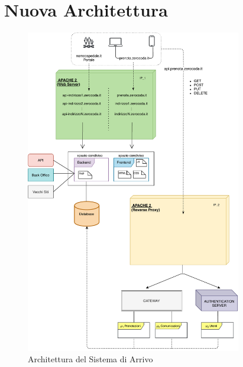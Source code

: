 \section{Nuova Architettura}
\begin{figure}[H]
    \centering
    \includegraphics[width=0.84\textwidth]{images/02_11_new_architecture.pdf}
    \caption{Architettura del Sistema di Arrivo}
    \label{fig:newarchitecture}
\end{figure}

